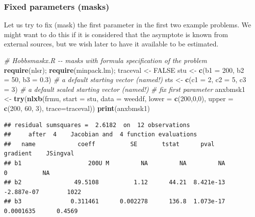 \documentclass[
]{article}
\newenvironment{Shaded}{\begin{snugshade}}{\end{snugshade}}
\newcommand{\AttributeTok}[1]{\textcolor[rgb]{0.13,0.29,0.53}{#1}}
\newcommand{\CommentTok}[1]{\textcolor[rgb]{0.56,0.35,0.01}{\textit{#1}}}
\newcommand{\ConstantTok}[1]{\textcolor[rgb]{0.56,0.35,0.01}{#1}}
\newcommand{\DecValTok}[1]{\textcolor[rgb]{0.00,0.00,0.81}{#1}}
\newcommand{\FloatTok}[1]{\textcolor[rgb]{0.00,0.00,0.81}{#1}}
\newcommand{\FunctionTok}[1]{\textcolor[rgb]{0.13,0.29,0.53}{\textbf{#1}}}
\newcommand{\NormalTok}[1]{#1}
\newcommand{\OtherTok}[1]{\textcolor[rgb]{0.56,0.35,0.01}{#1}}
\begin{document}
\hypertarget{fixed-parameters-masks}{%
\subsubsection{Fixed parameters (masks)}\label{fixed-parameters-masks}}

Let us try to fix (mask) the first parameter in the first two example
problems. We might want to do this if it is considered that the
asymptote is known from external sources, but we wish later to have it
available to be estimated.

\begin{Shaded}
\begin{Highlighting}[]
\CommentTok{\# Hobbsmaskx.R {-}{-} masks with formula specification of the problem}
\FunctionTok{require}\NormalTok{(nlsr); }\FunctionTok{require}\NormalTok{(minpack.lm); traceval }\OtherTok{\textless{}{-}} \ConstantTok{FALSE}
\NormalTok{stu }\OtherTok{\textless{}{-}} \FunctionTok{c}\NormalTok{(}\AttributeTok{b1 =} \DecValTok{200}\NormalTok{, }\AttributeTok{b2 =} \DecValTok{50}\NormalTok{, }\AttributeTok{b3 =} \FloatTok{0.3}\NormalTok{) }\CommentTok{\# a default starting vector (named!)}
\NormalTok{sts }\OtherTok{\textless{}{-}} \FunctionTok{c}\NormalTok{(}\AttributeTok{c1 =} \DecValTok{2}\NormalTok{, }\AttributeTok{c2 =} \DecValTok{5}\NormalTok{, }\AttributeTok{c3 =} \DecValTok{3}\NormalTok{) }\CommentTok{\# a default scaled starting vector (named!)}
\CommentTok{\# fix first parameter}
\NormalTok{anxbmsk1 }\OtherTok{\textless{}{-}} \FunctionTok{try}\NormalTok{(}\FunctionTok{nlxb}\NormalTok{(frmu, }\AttributeTok{start =}\NormalTok{ stu, }\AttributeTok{data =}\NormalTok{ weeddf, }\AttributeTok{lower =} \FunctionTok{c}\NormalTok{(}\DecValTok{200}\NormalTok{,}\DecValTok{0}\NormalTok{,}\DecValTok{0}\NormalTok{), }
            \AttributeTok{upper =} \FunctionTok{c}\NormalTok{(}\DecValTok{200}\NormalTok{, }\DecValTok{60}\NormalTok{, }\DecValTok{3}\NormalTok{), }\AttributeTok{trace=}\NormalTok{traceval))}
\FunctionTok{print}\NormalTok{(anxbmsk1)}
\end{Highlighting}
\end{Shaded}

\begin{verbatim}
## residual sumsquares =  2.6182  on  12 observations
##     after  4    Jacobian and  4 function evaluations
##   name            coeff          SE       tstat      pval      gradient    JSingval   
## b1                   200U M         NA         NA         NA           0          NA  
## b2               49.5108          1.12      44.21  8.421e-13  -2.887e-07        1022  
## b3              0.311461      0.002278      136.8  1.073e-17   0.0001635      0.4569
\end{verbatim}
\end{document}
